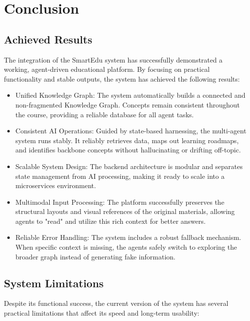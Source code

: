 \chapter{Conclusion}

\section{Achieved Results}
The integration of the SmartEdu system has successfully demonstrated a working, agent-driven educational platform. By focusing on practical functionality and stable outputs, the system has achieved the following results:

\begin{itemize}
    \item {Unified Knowledge Graph:} The system automatically builds a connected and non-fragmented Knowledge Graph. Concepts remain consistent throughout the course, providing a reliable database for all agent tasks.
    \item {Consistent AI Operations:} Guided by state-based harnessing, the multi-agent system runs stably. It reliably retrieves data, maps out learning roadmaps, and identifies backbone concepts without hallucinating or drifting off-topic.
    \item {Scalable System Design:} The backend architecture is modular and separates state management from AI processing, making it ready to scale into a microservices environment.
    \item {Multimodal Input Processing:} The platform successfully preserves the structural layouts and visual references of the original materials, allowing agents to "read" and utilize this rich context for better answers.
    \item {Reliable Error Handling:} The system includes a robust fallback mechanism. When specific context is missing, the agents safely switch to exploring the broader graph instead of generating fake information.
\end{itemize}

\section{System Limitations}
Despite its functional success, the current version of the system has several practical limitations that affect its speed and long-term usability:

